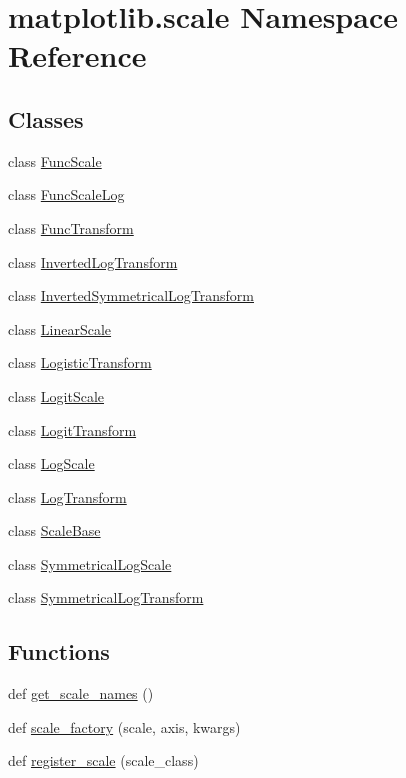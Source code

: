 \hypertarget{namespacematplotlib_1_1scale}{}\section{matplotlib.\+scale Namespace Reference}
\label{namespacematplotlib_1_1scale}
\subsection*{Classes}
\begin{DoxyCompactItemize}
\item 
class \hyperlink{classmatplotlib_1_1scale_1_1FuncScale}{Func\+Scale}
\item 
class \hyperlink{classmatplotlib_1_1scale_1_1FuncScaleLog}{Func\+Scale\+Log}
\item 
class \hyperlink{classmatplotlib_1_1scale_1_1FuncTransform}{Func\+Transform}
\item 
class \hyperlink{classmatplotlib_1_1scale_1_1InvertedLogTransform}{Inverted\+Log\+Transform}
\item 
class \hyperlink{classmatplotlib_1_1scale_1_1InvertedSymmetricalLogTransform}{Inverted\+Symmetrical\+Log\+Transform}
\item 
class \hyperlink{classmatplotlib_1_1scale_1_1LinearScale}{Linear\+Scale}
\item 
class \hyperlink{classmatplotlib_1_1scale_1_1LogisticTransform}{Logistic\+Transform}
\item 
class \hyperlink{classmatplotlib_1_1scale_1_1LogitScale}{Logit\+Scale}
\item 
class \hyperlink{classmatplotlib_1_1scale_1_1LogitTransform}{Logit\+Transform}
\item 
class \hyperlink{classmatplotlib_1_1scale_1_1LogScale}{Log\+Scale}
\item 
class \hyperlink{classmatplotlib_1_1scale_1_1LogTransform}{Log\+Transform}
\item 
class \hyperlink{classmatplotlib_1_1scale_1_1ScaleBase}{Scale\+Base}
\item 
class \hyperlink{classmatplotlib_1_1scale_1_1SymmetricalLogScale}{Symmetrical\+Log\+Scale}
\item 
class \hyperlink{classmatplotlib_1_1scale_1_1SymmetricalLogTransform}{Symmetrical\+Log\+Transform}
\end{DoxyCompactItemize}
\subsection*{Functions}
\begin{DoxyCompactItemize}
\item 
def \hyperlink{namespacematplotlib_1_1scale_aef5ece5d6c1a21c81f913a8345ff3c98}{get\+\_\+scale\+\_\+names} ()
\item 
def \hyperlink{namespacematplotlib_1_1scale_a0d68d41a05f9a8f65cc3b073460ba814}{scale\+\_\+factory} (scale, axis, kwargs)
\item 
def \hyperlink{namespacematplotlib_1_1scale_ae254463327993a3dd7e72b28186a6183}{register\+\_\+scale} (scale\+\_\+class)
\end{DoxyCompactItemize}


